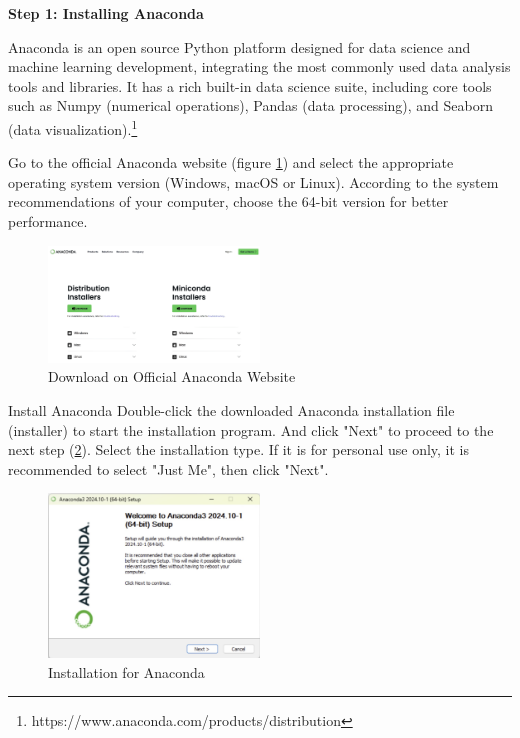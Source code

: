 \begin{ZhChapter}
    \textbf{Step 1: Installing Anaconda}

    Anaconda is an open source Python platform designed for data science and machine learning development, integrating the most commonly used data analysis tools and libraries. It has a rich built-in data science suite, including core tools such as Numpy (numerical operations), Pandas (data processing), and Seaborn (data visualization).\footnote{https://www.anaconda.com/products/distribution}

    Go to the official Anaconda website (figure \ref{fig: DownloadAnaconda}) and select the appropriate operating system version (Windows, macOS or Linux).
    According to the system recommendations of your computer, choose the 64-bit version for better performance.
    \begin{figure}[htbp]
        \centering
        \includegraphics[width = 0.5\textwidth]{image/DownloadAnaconda.jpg}
        \caption{Download on Official Anaconda Website}
        \label{fig: DownloadAnaconda}
    \end{figure}

    Install Anaconda
    Double-click the downloaded Anaconda installation file (installer) to start the installation program. And click "Next" to proceed to the next step (\ref{fig: InstallAnaconda}).
    Select the installation type. If it is for personal use only, it is recommended to select "Just Me", then click "Next".
    \begin{figure}[htbp]
        \centering
        \includegraphics[width = 0.5\textwidth]{image/InstallAnaconda.jpg}
        \caption{Installation for Anaconda}
        \label{fig: InstallAnaconda}
    \end{figure}


\end{ZhChapter}
